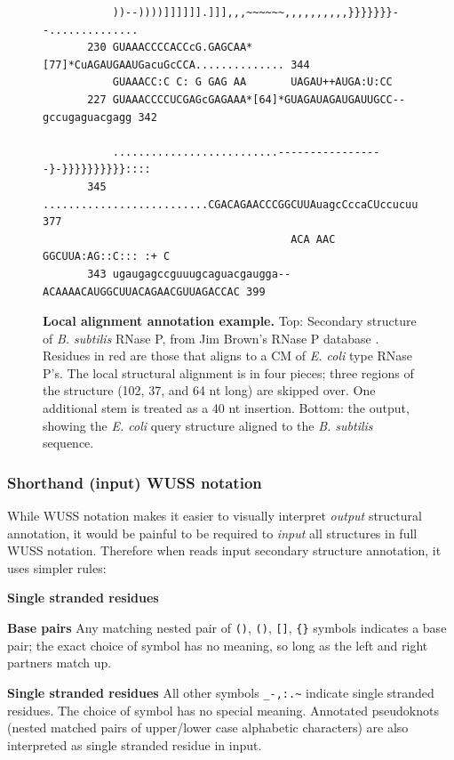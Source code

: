 \begin{figure}[tp]
\begin{center}
{\begin{BVerbatim}
           ))--))))]]]]]].]]],,,~~~~~~,,,,,,,,,,}}}}}}}--..............
       230 GUAAACCCCACCcG.GAGCAA*[77]*CuAGAUGAAUGacuGcCCA.............. 344     
           GUAAACC:C C: G GAG AA       UAGAU++AUGA:U:CC                
       227 GUAAACCCCUCGAGcGAGAAA*[64]*GUAGAUAGAUGAUUGCC--gccugaguacgagg 342     

           ..........................-----------------}-}}}}}}}}}}::::
       345 ..........................CGACAGAACCCGGCUUAuagcCccaCUccucuu 377     
                                       ACA AAC  GGCUUA:AG::C::: :+ C  
       343 ugaugagccguuugcaguacgaugga--ACAAAACAUGGCUUACAGAACGUUAGACCAC 399     
\end{BVerbatim}
}
\end{center}
\caption{\small \textbf{Local alignment annotation example.} Top:
Secondary
structure of \emph{B. subtilis} RNase P, from Jim Brown's RNase P
database \cite{Brown99}. Residues in red are those that  aligns
to a CM of \emph{E. coli} type RNase P's. The local structural
alignment is in four pieces; three regions of the
structure (102, 37, and 64 nt long) are skipped over. One additional
stem is treated as a 40 nt insertion. Bottom: the 
output, showing the \emph{E. coli} query structure aligned to the
\emph{B. subtilis} sequence.}
\label{fig:bsu-alignment}
\end{figure}

\subsubsection{Shorthand (input) WUSS notation}

While WUSS notation makes it easier to visually interpret
 \emph{output} structural annotation, it would be
painful to be required to \emph{input} all structures in full WUSS
notation. Therefore when  reads input secondary
structure annotation, it uses simpler rules:

\begin{sreitems}{\textbf{Single stranded residues}}
\item [\textbf{Base pairs}]
  Any matching nested pair of \verb+()+, \verb+()+, \verb+[]+, \verb+{}+
  symbols indicates a base pair; the exact choice of symbol has no
  meaning, so long as the left and right partners match up.

\item [\textbf{Single stranded residues}]
  All other symbols \verb+_-,:.~+ 
  indicate single stranded residues.
  The choice of symbol has no special meaning.
  Annotated pseudoknots (nested matched pairs of upper/lower case
  alphabetic characters) are also interpreted as single
  stranded residue in  input.
\end{sreitems}

